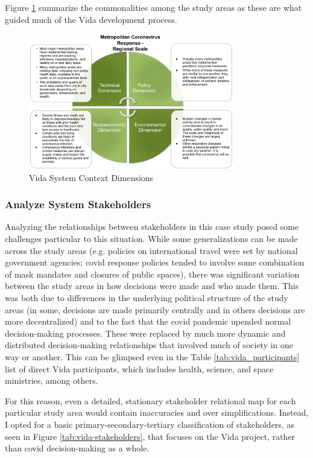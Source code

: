 Figure \ref{fig:dimensions_vida} summarize the commonalities among the study areas as these are what guided much of the Vida development process.

\begin{figure}[!htb] 
\centering
\includegraphics[width=0.8\textwidth]{Figures/chap5/dimensions_vida.png}
\caption[Vida System Context Dimensions]{Vida System Context Dimensions}
\label{fig:dimensions_vida}
\end{figure}


\subsubsection{Analyze System Stakeholders}

Analyzing the relationships between stakeholders in this case study posed some challenges particular to this situation. While some generalizations can be made across the study areas (e.g. policies on international travel were set by national government agencies; \ac{covid} response policies tended to involve some combination of mask mandates and closures of public spaces), there was significant variation between the study areas in how decisions were made and who made them. This was both due to differences in the underlying political structure of the study areas (in some, decisions are made primarily centrally and in others decisions are more decentralized) and to the fact that the \ac{covid} pandemic upended normal decision-making processes. These were replaced by much more dynamic and distributed decision-making relationships that involved much of society in one way or another. This can be glimpsed even in the Table \ref{tab:vida_participants} list of direct Vida participants, which includes health, science, and space ministries, among others.

For this reason, even a detailed, stationary stakeholder relational map for  each particular study area would contain inaccuracies and over simplifications. Instead, I opted for a basic primary-secondary-tertiary classification of stakeholders, as seen in Figure \ref{tab:vida-stakeholders}, that focuses on the Vida project, rather than \ac{covid} decision-making as a whole. 

